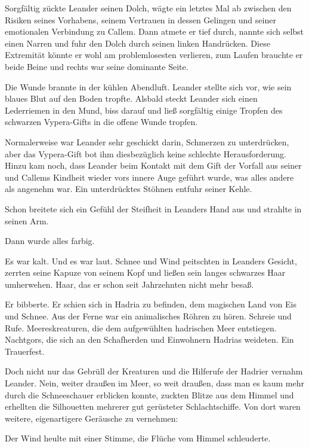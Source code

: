 Sorgfältig zückte Leander seinen Dolch, wägte ein letztes Mal ab zwischen den Risiken seines Vorhabens, seinem Vertrauen in dessen Gelingen und seiner emotionalen Verbindung zu Callem. Dann atmete er tief durch, nannte sich selbst einen Narren und fuhr den Dolch durch seinen linken Handrücken. Diese Extremität könnte er wohl am problemlosesten verlieren, zum Laufen brauchte er beide Beine und rechts war seine dominante Seite.

Die Wunde brannte in der kühlen Abendluft. Leander stellte sich vor, wie sein blaues Blut auf den Boden tropfte. Alsbald steckt Leander sich einen Lederriemen in den Mund, biss darauf und ließ sorgfältig einige Tropfen des schwarzen Vypera-Gifts in die offene Wunde tropfen.

Normalerweise war Leander sehr geschickt darin, Schmerzen zu unterdrücken, aber das Vypera-Gift bot ihm diesbezüglich keine schlechte Herausforderung. Hinzu kam noch, dass Leander beim Kontakt mit dem Gift der Vorfall aus seiner und Callems Kindheit wieder vors innere Auge geführt wurde, was alles andere als angenehm war. Ein unterdrücktes Stöhnen entfuhr seiner Kehle.

Schon breitete sich ein Gefühl der Steifheit in Leanders Hand aus und strahlte in seinen Arm.

Dann wurde alles farbig.



\trennzeichen



Es war kalt. Und es war laut. Schnee und Wind peitschten in Leanders Gesicht, zerrten seine Kapuze von seinem Kopf und ließen sein langes schwarzes Haar umherwehen. Haar, das er schon seit Jahrzehnten nicht mehr besaß.

Er bibberte. Er schien sich in Hadria zu befinden, dem magischen Land von Eis und Schnee. Aus der Ferne war ein animalisches Röhren zu hören. Schreie und Rufe. Meereskreaturen, die dem aufgewühlten hadrischen Meer entstiegen. Nachtgors, die sich an den Schafherden und Einwohnern Hadrias weideten. Ein Trauerfest.

Doch nicht nur das Gebrüll der Kreaturen und die Hilferufe der Hadrier vernahm Leander. Nein, weiter draußen im Meer, so weit draußen, dass man es kaum mehr durch die Schneeschauer erblicken konnte, zuckten Blitze aus dem Himmel und erhellten die Silhouetten mehrerer gut gerüsteter Schlachtschiffe. Von dort waren weitere, eigenartigere Geräusche zu vernehmen:

Der Wind heulte mit einer Stimme, die Flüche vom Himmel schleuderte.

